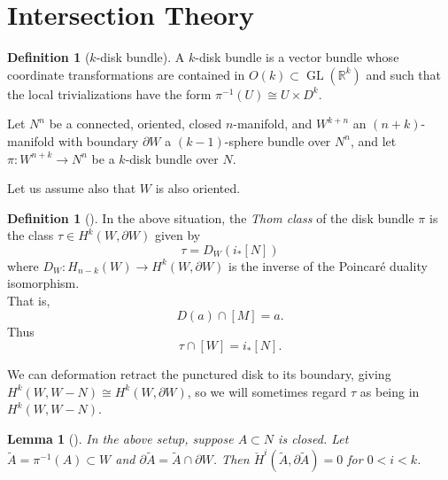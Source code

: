 \documentclass[reqno]{amsart}
\newtheorem{lemma}[theorem]{Lemma}
\theoremstyle{definition}
\newtheorem{definition}[theorem]{Definition}
\theoremstyle{remark}
\DeclareMathOperator{\GL}{GL}
\begin{document}
\section{Intersection Theory}


\begin{definition}[$k$-disk bundle]
    A $k$-disk bundle is a vector bundle whose
    coordinate transformations are contained in
    $O(k) \subset \GL (\mathbb{R}^{k})$ and such that
    the local trivializations have the form
    $\pi^{-1}(U) \cong U \times D^{k}$.
\end{definition}

Let $N^{n}$ be a connected, oriented, closed $n$-manifold, and
$W^{k+n}$ an $(n+k)$-manifold with boundary
$\partial W$ a $(k-1)$-sphere bundle over $N^{n}$, and let
$\pi \colon W^{n+k} \to N^{n}$ be a $k$-disk bundle over $N$.

Let us assume also that $W$ is also oriented.

\begin{definition}[]
    In the above situation, the \textit{Thom class} of the
    disk bundle $\pi$ is the class $\tau \in 
    H^{k}\left( W, \partial W \right) $ given by
    \[
    \tau = D_W \left( i_* \left[ N \right]  \right) 
    \] 
    where $D_W \colon H_{n-k} (W) \to H^{k}(W, \partial W)$ is
    the inverse of the Poincaré duality isomorphism.\\
    That is,
    \[
    D(a) \cap \left[ M \right]  = a.
    \] 
    Thus
    \[
    \tau \cap \left[ W \right] =
    i_* \left[ N \right] .
    \] 
\end{definition}

We can deformation retract the punctured disk to its boundary, giving
$H^{k}(W, W-N) \cong H^{k}(W, \partial W)$, so we will
sometimes regard
$\tau$ as being in $H^{k}(W, W-N)$.

\begin{lemma}[]
    In the above setup, suppose
    $A \subset N$ is closed. Let
    $\tilde{A} = \pi^{-1}(A) \subset W$ and
    $\partial \tilde{A} = \tilde{A} \cap \partial W$.
    Then
    $\check{H}^{i}\left( \tilde{A},
    \partial \tilde{A} \right) = 0$ for 
    $0<i < k$.
\end{lemma}
\end{document}

